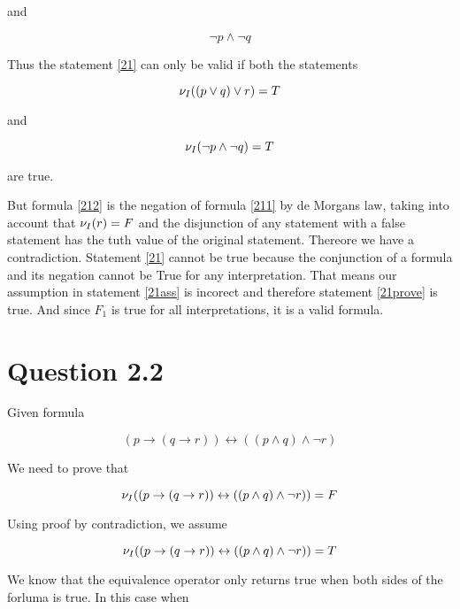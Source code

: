 \documentclass[10pt,a4paper]{article}
\begin{document}
and 

\begin{equation}
\label{212}
\neg p \wedge \neg q 
\end{equation}

Thus the statement \ref{21} can only be valid if both the statements

\begin{equation}
 \nu_I(( p \vee q) \vee r ) = T
\end{equation}

and 

\begin{equation}
 \nu_I( \neg p \wedge \neg q ) = T
\end{equation}

are true.

But formula \ref{212} is the negation of formula \ref{211} by de Morgans law, taking into account that $\nu_I(r) = F$ and the disjunction of any statement with a false statement has the tuth value of the original statement. 
Thereore we have a contradiction. Statement \ref{21} cannot be true because the conjunction of a formula and its negation cannot be True for any interpretation. 
That means our assumption in statement \ref{21ass} is incorect and therefore statement \ref{21prove} is true. And since $F_1$ is true for all interpretations, it is a valid formula.

\section{Question 2.2}

Given formula

\begin{equation}
\label{220}
(p \rightarrow ( q \rightarrow r )) \leftrightarrow (( p \wedge q) \wedge \neg r) 
\end{equation}

We need to prove that 

\begin{equation}
\nu_I((p \rightarrow ( q \rightarrow r )) \leftrightarrow (( p \wedge q) \wedge \neg r) ) = F 
\end{equation}

Using proof by contradiction, we assume 

\begin{equation}
\nu_I((p \rightarrow ( q \rightarrow r )) \leftrightarrow (( p \wedge q) \wedge \neg r) ) = T
\end{equation}

We know that the equivalence operator only returns true when both sides of the forluma is true. In this case when
\end{document}

